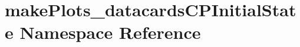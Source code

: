 \hypertarget{namespacemakePlots__datacardsCPInitialState}{
\section{makePlots\_\-datacardsCPInitialState Namespace Reference}
\label{namespacemakePlots__datacardsCPInitialState}
}
